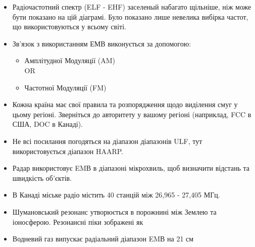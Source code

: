 \begin{itemize}

\item Радіочастотний спектр (ELF - EHF) заселеный набагато щільніше, ніж може бути показано на цій діаграмі. Було показано лише невелика вибірка частот, що використовуються у всьому світі.

\item Зв'язок з використанням ЕМВ виконується за допомогою:
\begin{itemize}
\item Амплітудної Модуляції (AM)
\vspace{0.1in}\\
\vspace{0.04in}OR
\item Частотної Модуляції (FM)
\vspace{0.1in}
\end{itemize}

\item Кожна країна має свої правила та розпорядження щодо виділення смуг у цьому регіоні. Зверніться до авторитету у вашому регіоні (наприклад, FCC в США, DOC в Канаді).

\item Не всі посилання погодяться на діапазон діапазонів ULF, тут використовується діапазон HAARP.

\item Радар використовує EMВ в діапазоні мікрохвиль, щоб визначити відстань та швидкість об'єктів.

\item В Канаді міське радіо містить 40 станцій між 26,965 - 27,405 МГц.

\item Шумановський резонанс утворюється в порожнині між Землею та іоносферою. Резонансні піки зображені як 

\item Водневий газ випускає радіальний діапазон EMВ на 21 см 


\end{itemize}

